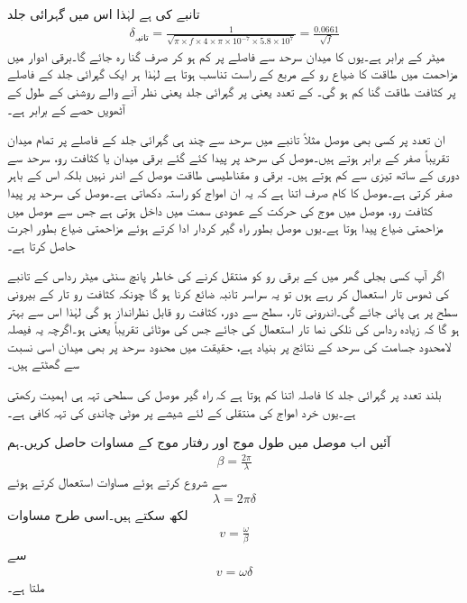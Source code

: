 تانبے کی  ہے لہٰذا اس میں گہرائی جلد
\begin{align*}
\delta_{\text{تانبہ}}=\frac{1}{\sqrt{\pi \times f  \times 4 \times \pi \times 10^{-7} \times 5.8 \times 10^{7}}}=\frac{0.0661}{\sqrt{f}}
\end{align*}
میٹر کے برابر ہے۔یوں  کا میدان سرحد سے  فاصلے پر کم ہو کر صرف  گنا رہ جائے گا۔برقی ادوار میں مزاحمت میں طاقت کا ضیاع رو کے مربع کے راست تناسب ہوتا ہے لہٰذا ہر ایک گہرائی جلد کے فاصلے پر کثافت طاقت  گنا کم ہو گی۔ کے تعدد یعنی  پر گہرائی جلد  یعنی نظر آنے والے روشنی کے طول کے آٹھویں حصے  کے برابر ہے۔

ان تعدد پر کسی بھی موصل مثلاً تانبے میں سرحد سے چند ہی گہرائی جلد کے فاصلے پر تمام میدان تقریباً صفر کے برابر ہوتے ہیں۔موصل کی سرحد پر پیدا کئے گئے برقی میدان یا کثافت رو، سرحد سے دوری کے ساتھ تیزی سے کم ہوتے ہیں۔ برقی و مقناطیسی طاقت موصل کے اندر نہیں بلکہ اس کے باہر صفر کرتی ہے۔موصل کا کام صرف اتنا ہے کہ یہ ان امواج کو راستہ دکھاتی ہے۔موصل کی سرحد پر پیدا کثافت رو، موصل میں موج کی حرکت کے عمودی سمت میں داخل ہوتی ہے جس سے موصل میں مزاحمتی ضیاع پیدا ہوتا ہے۔یوں موصل بطور راہ گیر  کردار ادا کرتے ہوئے مزاحمتی ضیاع بطور اجرت حاصل کرتا ہے۔  

اگر آپ کسی بجلی گھر میں   کے برقی رو کو منتقل کرنے کی خاطر پانچ سنٹی میٹر رداس کے تانبے کی ٹھوس تار استعمال کر رہے ہوں تو یہ سراسر تانبہ ضائع کرنا ہو گا چونکہ کثافت رو تار کے بیرونی سطح پر ہی پائی جائے گی۔اندرونی تار، سطح سے دور، کثافت رو قابل نظرانداز ہو گی لہٰذا اس سے بہتر ہو گا کہ زیادہ رداس کی نلکی نما تار استعمال کی جائے جس کی موٹائی تقریباً  یعنی  ہو۔اگرچہ یہ فیصلہ لامحدود جسامت کی سرحد کے نتائج پر بنیاد ہے، حقیقت میں محدود سرحد پر بھی میدان اسی نسبت سے گھٹتے ہیں۔

بلند تعدد پر گہرائی جلد کا فاصلہ اتنا کم ہوتا ہے کہ راہ گیر موصل کی سطحی تہہ ہی اہمیت رکھتی ہے۔یوں خرد امواج کی منتقلی کے لئے شیشے پر  موٹی چاندی کی تہہ کافی ہے۔

آئیں اب موصل میں طول موج اور رفتار موج کے مساوات حاصل کریں۔ہم
\begin{align*}
\beta=\frac{2\pi}{\lambda}
\end{align*}
سے شروع کرتے ہوئے مساوات  استعمال کرتے ہوئے
\begin{align*}
\lambda=2\pi\delta
\end{align*}
لکھ سکتے ہیں۔اسی طرح مساوات 
\begin{align*}
v=\frac{\omega}{\beta}
\end{align*}
سے
\begin{align}
v=\omega \delta
\end{align}
ملتا ہے۔

